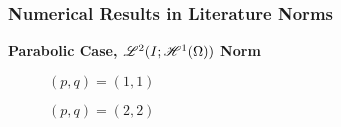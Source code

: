 \begin{frame}
    \frametitle{Numerical Results in Literature Norms}

    \vspace*{\fill}
    \begin{center}
        {\color{\accentcolor} \Large \textbf{Parabolic Case, $\mathscr{L}^{2}(I; \mathscr{H}^{1}(\Omega))$ Norm}}
    \end{center}

    \vspace*{\fill}

    \begin{multicols}{2}

        \begin{center}
            \begin{minipage}{0.45\textwidth}
                \begin{figure}[!ht]
                    \caption{$\left( p, q  \right) = \left( 1, 1  \right)$}
                    \label{fig:p_1_1_par_l2h1}
                    
                \end{figure}
            \end{minipage}
        \end{center}
        \vspace*{\fill}

        \vfill\null
        \columnbreak

        \begin{center}
            \begin{minipage}{0.45\textwidth}
                \begin{figure}[!ht]
                    \caption{$\left( p, q  \right) = \left( 2, 2  \right)$}
                    \label{fig:p_2_2_par_l2h1}
                    
                \end{figure}
            \end{minipage}
        \end{center}
        \vspace*{\fill}

    \end{multicols}
    \vspace*{\fill}
    
\end{frame}

